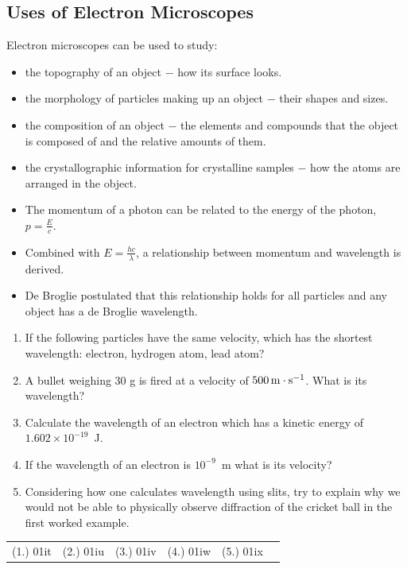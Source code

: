 \subsection{Uses of Electron Microscopes}
Electron microscopes can be used to study:
\begin{itemize}
\item the topography of an object $-$ how its surface looks.
\item the morphology of particles making up an object  $-$ their shapes and sizes.
\item the composition of an object $-$ the elements and compounds that the object is composed of and the relative amounts of them.
\item the crystallographic information for crystalline samples $-$ how the atoms are arranged in the object.
\end{itemize}

\begin{itemize}
\item The momentum of a photon can be related to the energy of the photon, $p=\frac{E}{c}$.
\item Combined with $E=\frac{hc}{\lambda}$, a relationship between momentum and wavelength is derived.
\item De Broglie postulated that this relationship holds for all particles and any object has a de Broglie wavelength.
\end{itemize}


\begin{eocexercises}{}
\begin{enumerate}
  \item If the following particles have the same velocity, which has the shortest wavelength: electron, hydrogen atom, lead atom? 
\item A bullet weighing 30 g is fired at a velocity of $500\,\mathrm{m \cdot s^{-1}}$. What is its wavelength?
\item Calculate the wavelength of an electron which has a kinetic energy of $1.602\times10^{-19}$~J.
\item If the wavelength of an electron is $10^{-9}$~m what is its velocity?
\item Considering how one calculates wavelength using slits, try to explain why we would not be able to physically observe diffraction of the cricket ball in the first worked example.
 \end{enumerate}
\par \practiceinfo
\par \begin{tabular}[h]{cccccc}
(1.)	01it	&
(2.)	01iu	&
(3.)	01iv	&
(4.)	01iw	&
(5.)	01ix	&
\end{tabular}
\end{eocexercises}






